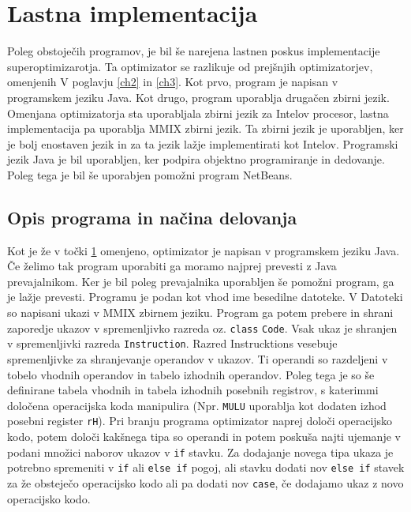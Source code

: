\documentclass[a4paper, 12pt]{book}
\begin{document}
\chapter{Lastna implementacija}
\label{ch4}
Poleg obstoječih programov, je bil še narejena lastnen poskus implementacije superoptimizarotja. Ta optimizator se razlikuje od prejšnjih optimizatorjev, omenjenih V poglavju \ref{ch2} in \ref{ch3}. Kot prvo, program je napisan v programskem jeziku Java. Kot drugo, program uporablja drugačen zbirni jezik. Omenjana optimizatorja sta uporabljala zbirni jezik za Intelov procesor, lastna implementacija pa uporablja MMIX zbirni jezik. Ta zbirni jezik je uporabljen, ker je bolj enostaven jezik in za ta jezik lažje implementirati kot Intelov. Programski jezik Java je bil uporabljen, ker podpira objektno programiranje in dedovanje. Poleg tega je bil še uporabjen pomožni program NetBeans.

\section{Opis programa in načina delovanja}
\label{prev4}
Kot je že v točki \ref{ch4} omenjeno, optimizator je napisan v programskem jeziku Java. Če želimo tak program uporabiti ga moramo najprej prevesti z Java prevajalnikom. Ker je bil poleg prevajalnika uporabljen še pomožni program, ga je lažje prevesti. Programu je podan kot vhod ime besedilne datoteke. V Datoteki so napisani ukazi v MMIX zbirnem jeziku. Program ga potem prebere in shrani zaporedje ukazov v spremenljivko razreda oz. \texttt{class} \texttt{Code}. Vsak ukaz je shranjen v spremenljivki razreda \texttt{Instruction}. Razred {Instrucktions} vesebuje spremenljivke za shranjevanje operandov v ukazov. Ti operandi so razdeljeni v tobelo vhodnih operandov in tabelo izhodnih operandov. Poleg tega je so še definirane tabela vhodnih in tabela izhodnih posebnih registrov, s katerimmi določena operacijska koda manipulira (Npr. \texttt{MULU} uporablja kot dodaten izhod posebni register \texttt{rH}). Pri branju programa optimizator naprej določi operacijsko kodo, potem določi kakšnega tipa so operandi in potem poskuša najti ujemanje v podani množici naborov ukazov v \texttt{if} stavku. Za dodajanje novega tipa ukaza je potrebno spremeniti v \texttt{if} ali \texttt{else if} pogoj, ali stavku dodati nov \texttt{else if} stavek za že obsteječo operacijsko kodo ali pa dodati nov \texttt{case}, če dodajamo ukaz z novo operacijsko kodo.

\medskip
		
\end{document}
